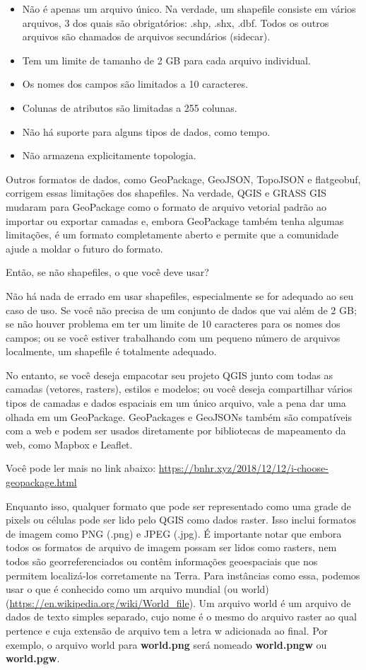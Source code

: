 \documentclass[
]{krantz}
\providecommand{\tightlist}{%
  \setlength{\itemsep}{0pt}\setlength{\parskip}{0pt}}
\begin{document}
\begin{itemize}
\tightlist
\item
  Não é apenas um arquivo único. Na verdade, um shapefile consiste em vários arquivos, 3 dos quais são obrigatórios: .shp, .shx, .dbf. Todos os outros arquivos são chamados de arquivos secundários (sidecar).
\item
  Tem um limite de tamanho de 2 GB para cada arquivo individual.
\item
  Os nomes dos campos são limitados a 10 caracteres.
\item
  Colunas de atributos são limitadas a 255 colunas.
\item
  Não há suporte para alguns tipos de dados, como tempo.
\item
  Não armazena explicitamente topologia.
\end{itemize}

Outros formatos de dados, como GeoPackage, GeoJSON, TopoJSON e flatgeobuf, corrigem essas limitações dos shapefiles. Na verdade, QGIS e GRASS GIS mudaram para GeoPackage como o formato de arquivo vetorial padrão ao importar ou exportar camadas e, embora GeoPackage também tenha algumas limitações, é um formato completamente aberto e permite que a comunidade ajude a moldar o futuro do formato.

Então, se não shapefiles, o que você deve usar?

Não há nada de errado em usar shapefiles, especialmente se for adequado ao seu caso de uso. Se você não precisa de um conjunto de dados que vai além de 2 GB; se não houver problema em ter um limite de 10 caracteres para os nomes dos campos; ou se você estiver trabalhando com um pequeno número de arquivos localmente, um shapefile é totalmente adequado.

No entanto, se você deseja empacotar seu projeto QGIS junto com todas as camadas (vetores, rasters), estilos e modelos; ou você deseja compartilhar vários tipos de camadas e dados espaciais em um único arquivo, vale a pena dar uma olhada em um GeoPackage. GeoPackages e GeoJSONs também são compatíveis com a web e podem ser usados diretamente por bibliotecas de mapeamento da web, como Mapbox e Leaflet.

Você pode ler mais no link abaixo: \href{https://bnhr.xyz/2018/12/12/i-choose\%20-geopackage.html}{https://bnhr.xyz/2018/12/12/i-choose-geopackage.html}

Enquanto isso, qualquer formato que pode ser representado como uma grade de pixels ou células pode ser lido pelo QGIS como dados raster. Isso inclui formatos de imagem como PNG (.png) e JPEG (.jpg). É importante notar que embora todos os formatos de arquivo de imagem possam ser lidos como rasters, nem todos são georreferenciados ou contêm informações geoespaciais que nos permitem localizá-los corretamente na Terra. Para instâncias como essa, podemos usar o que é conhecido como um arquivo mundial (ou world) (\url{https://en.wikipedia.org/wiki/World_file}). Um arquivo world é um arquivo de dados de texto simples separado, cujo nome é o mesmo do arquivo raster ao qual pertence e cuja extensão de arquivo tem a letra w adicionada ao final. Por exemplo, o arquivo world para \textbf{world.png} será nomeado \textbf{world.pngw} ou \textbf{world.pgw}.
\end{document}
